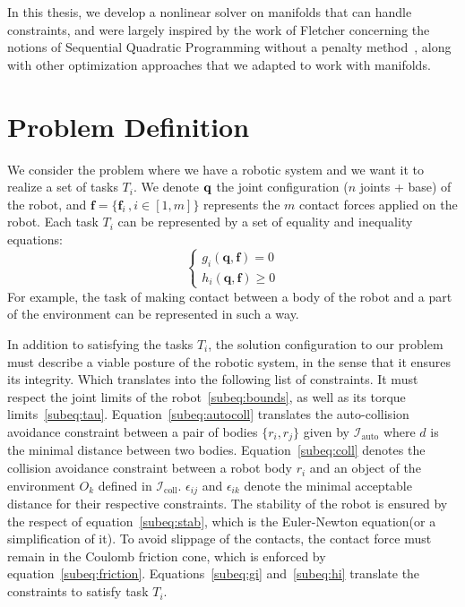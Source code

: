 In this thesis, we develop a nonlinear solver on manifolds that can handle constraints, and were largely inspired by the work of Fletcher concerning the notions of Sequential Quadratic Programming without a penalty method~\cite{Fletcher:ifip:2006, fletcher2010sequential, fletcher:mathprog:2000}, along with other optimization approaches that we adapted to work with manifolds.

\section{Problem Definition}
\label{sec:problem_definition}


We consider the problem where we have a robotic system and we want it to realize a set of tasks $T_i$.
We denote $\bf q$ the joint configuration ($n$ joints + base) of the robot, and $\mathbf{f} =\{\mathbf{f}_i\,, i\in[1,m]\}$ represents the $m$ contact forces applied on the robot.
Each task $T_i$ can be represented by a set of equality and inequality equations:
\begin{equation}
  \left\{
    \begin{aligned}
    g_i(\mathbf{q},\mathbf{f}) = 0\\
    h_i(\mathbf{q},\mathbf{f}) \geq 0
    \end{aligned}
  \right.
\end{equation}
For example, the task of making contact between a body of the robot and a part of the environment can be represented in such a way.

In addition to satisfying the tasks $T_i$, the solution configuration to our problem must describe a viable posture of the robotic system, in the sense that it ensures its integrity.
Which translates into the following list of constraints.
It must respect the joint limits of the robot~\eqref{subeq:bounds}, as well as its torque limits~\eqref{subeq:tau}.
Equation~\eqref{subeq:autocoll} translates the auto-collision avoidance constraint between a pair of bodies $\{r_i, r_j\}$ given by $\mathcal{I}_\text{auto}$ where $d$ is the minimal distance between two bodies.
Equation~\eqref{subeq:coll} denotes the collision avoidance constraint between a robot body $r_i$ and an object of the environment $O_k$ defined in $\mathcal{I}_\text{coll}$.
$\epsilon_{ij}$ and $\epsilon_{ik}$ denote the minimal acceptable distance for their respective constraints.
The stability of the robot is ensured by the respect of equation~\eqref{subeq:stab}, which is the Euler-Newton equation(or a simplification of it).
To avoid slippage of the contacts, the contact force must remain in the Coulomb friction cone, which is enforced by equation~\eqref{subeq:friction}.
Equations~\eqref{subeq:gi} and~\eqref{subeq:hi} translate the constraints to satisfy task $T_i$.

